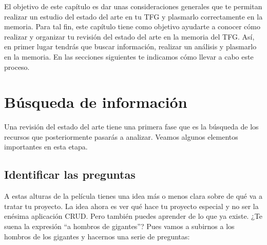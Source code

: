 El objetivo de este capítulo es dar unas consideraciones generales que te permitan realizar un estudio del estado del arte en tu TFG y plasmarlo correctamente en la memoria. Para tal fin, este capítulo tiene como objetivo ayudarte a conocer cómo realizar y organizar tu revisión del estado del arte en la memoria del TFG. Así, en primer lugar tendrás que buscar información, realizar un análisis y plasmarlo en la memoria. En las secciones siguientes te indicamos cómo llevar a cabo este proceso.

\section{Búsqueda de información}

Una revisión del estado del arte tiene una primera fase que es la búsqueda de los recursos que posteriormente pasarás a analizar. Veamos algunos elementos importantes en esta etapa.

\subsection{Identificar las preguntas}


A estas alturas de la película tienes una idea más o menos clara sobre de qué va a tratar tu proyecto. La idea ahora es ver qué hace tu proyecto especial y no ser la enésima aplicación CRUD. Pero también puedes aprender de lo que ya existe. ¿Te suena la expresión ``a hombros de gigantes''? Pues vamos a subirnos a los hombros de los gigantes y hacernos una serie de preguntas:

